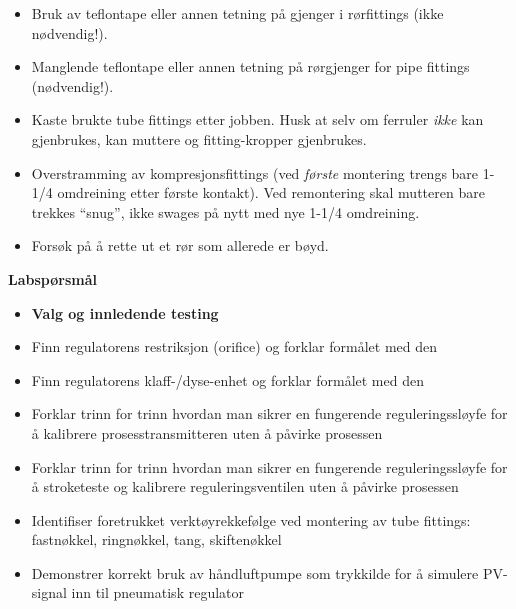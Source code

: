 \begin{itemize}
\item{} Bruk av teflontape eller annen tetning på gjenger i rørfittings (ikke nødvendig!).
\item{} Manglende teflontape eller annen tetning på rørgjenger for pipe fittings (nødvendig!).
\item{} Kaste brukte tube fittings etter jobben. Husk at selv om ferruler {\it ikke} kan gjenbrukes, kan muttere og fitting-kropper gjenbrukes.
\item{} Overstramming av kompresjonsfittings (ved {\it første} montering trengs bare 1-1/4 omdreining etter første kontakt). Ved remontering skal mutteren bare trekkes ``snug'', ikke swages på nytt med nye 1-1/4 omdreining.
\item{} Forsøk på å rette ut et rør som allerede er bøyd.
\end{itemize}





\vfil \eject

\noindent
{\bf Labspørsmål}

\vskip 5pt

\begin{itemize}
\item{} {\bf Valg og innledende testing}
\item{} Finn regulatorens restriksjon (orifice) og forklar formålet med den
\item{} Finn regulatorens klaff-/dyse-enhet og forklar formålet med den
\item{} Forklar trinn for trinn hvordan man sikrer en fungerende reguleringssløyfe for å kalibrere prosesstransmitteren uten å påvirke prosessen
\item{} Forklar trinn for trinn hvordan man sikrer en fungerende reguleringssløyfe for å stroketeste og kalibrere reguleringsventilen uten å påvirke prosessen
\item{} Identifiser foretrukket verktøyrekkefølge ved montering av tube fittings: fastnøkkel, ringnøkkel, tang, skiftenøkkel
\item{} Demonstrer korrekt bruk av håndluftpumpe som trykkilde for å simulere PV-signal inn til pneumatisk regulator
\end{itemize}

\filbreak

